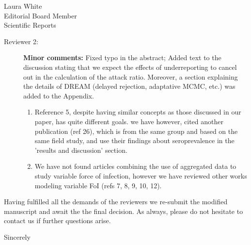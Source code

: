 \documentclass[a4paper,10pt]{letter}
\begin{document}
\begin{letter}{Laura White\\Editorial Board Member\\Scientific Reports }
\begin{description}
 \item [Reviewer 2:] \textbf{Minor comments:} Fixed typo in the abstract; Added 
text to the discussion stating that we expect the effects of underreporting to 
cancel out in the calculation of the attack ratio.
Moreover, a section explaining the details of DREAM (delayed rejection, 
adaptative MCMC, etc.) was added to the Appendix.
 \begin{enumerate}
  \item Reference 5, despite having similar concepts as those discussed in our 
paper, has quite different goals. we have however, cited another publication 
(ref 26), which is from the same group and based on the same field study, and 
use their findings about seroprevalence in the 'results and discussion' section.
\item We have not found articles combining the use of aggregated data to study 
variable force of infection, however we have reviewed other works modeling 
variable FoI (refs 7, 8, 9, 10, 12).
 \end{enumerate}

\end{description}

Having fulfilled all the demands of the reviewers we re-submit the modified 
manuscript and await the the final decision. As always, please do not hesitate 
to contact us if further questions arise.


\signature{Flávio Codeço Coelho\\Professor}

\closing{Sincerely}


\end{letter}
\end{document}
